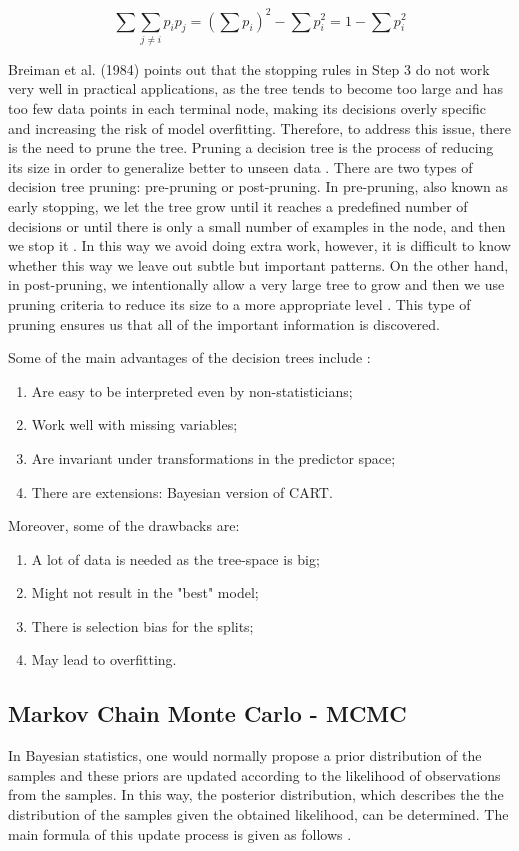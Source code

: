 \documentclass{usiinftr}
\begin{document}
\begin{equation}
\sum \sum_{j \neq i} p_{i} p_{j}=\left(\sum p_{i}\right)^{2}-\sum p_{i}^{2}=1-\sum p_{i}^{2}
\end{equation}

Breiman et al. (1984) points out that the stopping rules in Step 3 do not work very well in practical applications, as the tree tends to become too large and has too few data points in each terminal node, making its decisions overly specific and increasing the risk of model overfitting. Therefore, to address this issue, there is the need to prune the tree. Pruning a decision tree is the process of reducing its size in order to generalize better to unseen data \cite{4}. There are two types of decision tree pruning: pre-pruning or post-pruning. In pre-pruning, also known as early stopping, we let the tree grow until it reaches a predefined number of decisions or until there is only a small number of examples in the node, and then we stop it \cite{4}. In this way we avoid doing extra work, however, it is difficult to know whether this way we leave out subtle but important patterns. On the other hand, in post-pruning, we intentionally allow a very large tree to grow and then we use pruning criteria to reduce its size to a more appropriate level \cite{4}. This type of pruning ensures us that all of the important information is discovered. 
	
Some of the main advantages of the decision trees include \cite{4}:
\begin{enumerate}
\item Are easy to be interpreted even by non-statisticians;
\item Work well with missing variables;
\item Are invariant under transformations in the predictor space;
\item There are extensions: Bayesian version of CART.
\end{enumerate}

Moreover, some of the drawbacks are:
\begin{enumerate}
\item A lot of data is needed as the tree-space is big;
\item Might not result in the "best" model;
\item There is selection bias for the splits;
\item May lead to overfitting.
\end{enumerate}

\subsection{Markov Chain Monte Carlo - MCMC}
In Bayesian statistics, one would normally propose a prior distribution of the samples and these priors are updated according to the likelihood of observations from the samples. In this way, the posterior distribution, which describes the the distribution of the samples given the obtained likelihood, can be determined. The main formula of this update process is given as follows \cite{21}.
\end{document}
